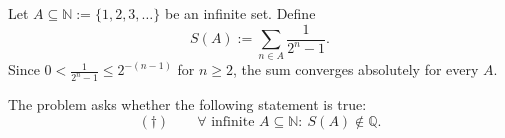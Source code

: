 Let $A\subseteq\mathbb{N}:=\{1,2,3,\dots\}$ be an infinite set. Define
\[
S(A):=\sum_{n\in A}\frac{1}{2^n-1}.
\]
Since $0<\frac{1}{2^n-1}\le 2^{-(n-1)}$ for $n\ge 2$, the sum converges absolutely for every $A$.

The problem asks whether the following statement is true:
\[
(\dagger)\qquad \forall\text{ infinite }A\subseteq\mathbb{N}:\ S(A)\notin\mathbb{Q}.
\]
